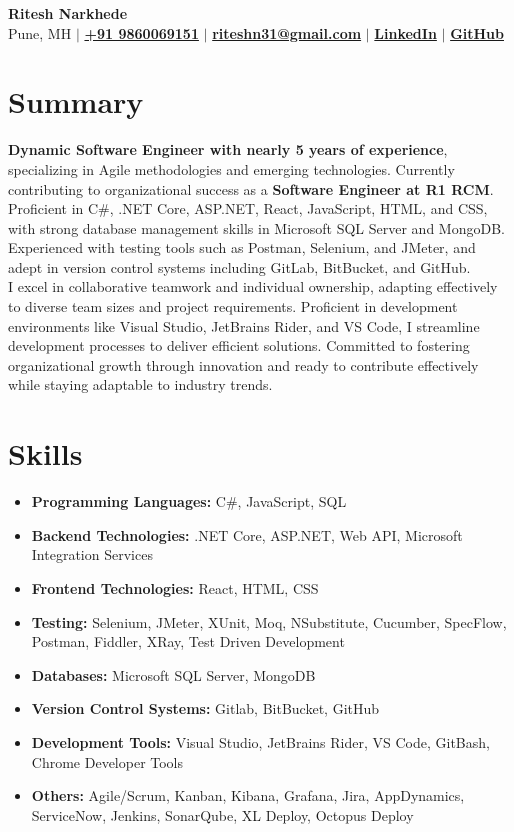 \documentclass{article}
\begin{document}
\pagestyle{empty}

\begin{center}
	\textbf{\LARGE Ritesh Narkhede}\\
	Pune, MH $\vert$ 
	\href{tel:+919860069151}{\textbf{+91 9860069151}} $\vert$ \href{mailto:riteshn31@gmail.com}{\textbf{riteshn31@gmail.com}} $\vert$ \href{https://www.linkedin.com/in/ritesh-narkhede-79963a108}{\textbf{LinkedIn}} $\vert$
    \href{https://riteshn31.github.io/}{\textbf{GitHub}}
\end{center}

\section*{Summary}

\noindent
\textbf{Dynamic Software Engineer with nearly 5 years of experience}, specializing in Agile methodologies and emerging technologies. Currently contributing to organizational success as a \textbf{Software Engineer at R1 RCM}. Proficient in C\#, .NET Core, ASP.NET, React, JavaScript, HTML, and CSS, with strong database management skills in Microsoft SQL Server and MongoDB. Experienced with testing tools such as Postman, Selenium, and JMeter, and adept in version control systems including GitLab, BitBucket, and GitHub.
\medskip\\
\noindent
I excel in collaborative teamwork and individual ownership, adapting effectively to diverse team sizes and project requirements. Proficient in development environments like Visual Studio, JetBrains Rider, and VS Code, I streamline development processes to deliver efficient solutions. Committed to fostering organizational growth through innovation and ready to contribute effectively while staying adaptable to industry trends.

\section*{Skills}
\begin{itemize}[label=]
	\item \textbf{Programming Languages:} C\#, JavaScript, SQL
	\item \textbf{Backend Technologies:} .NET Core, ASP.NET, Web API, Microsoft Integration Services 
	\item \textbf{Frontend Technologies:} React, HTML, CSS 
	\item \textbf{Testing:} Selenium, JMeter, XUnit, Moq, NSubstitute, Cucumber, SpecFlow, Postman, Fiddler, XRay, Test Driven Development 
	\item \textbf{Databases:} Microsoft SQL Server, MongoDB 
	\item \textbf{Version Control Systems:} Gitlab, BitBucket, GitHub 
	\item \textbf{Development Tools:} Visual Studio, JetBrains Rider, VS Code, GitBash, Chrome Developer Tools 
	\item \textbf{Others:} Agile/Scrum, Kanban, Kibana, Grafana, Jira, AppDynamics, ServiceNow, Jenkins, SonarQube, XL Deploy, Octopus Deploy
\end{itemize}
\end{document}
